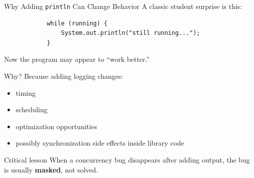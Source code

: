 \documentclass[aspectratio=169,11pt]{beamer}
\begin{document}
	\begin{frame}[fragile]{Why Adding \texttt{println} Can Change Behavior}
		A classic student surprise is this:
		
		\begin{lstlisting}
			while (running) {
				System.out.println("still running...");
			}
		\end{lstlisting}
		
		Now the program may appear to ``work better.''
		
		\vspace{0.3cm}
		
		\begin{block}{Why?}
			Because adding logging changes:
			\begin{itemize}
				\item timing
				\item scheduling
				\item optimization opportunities
				\item possibly synchronization side effects inside library code
			\end{itemize}
		\end{block}
		
		\vspace{0.25cm}
		
		\begin{alertblock}{Critical lesson}
			When a concurrency bug disappears after adding output, the bug is usually \textbf{masked}, not solved.
		\end{alertblock}
	\end{frame}
	
\end{document}
